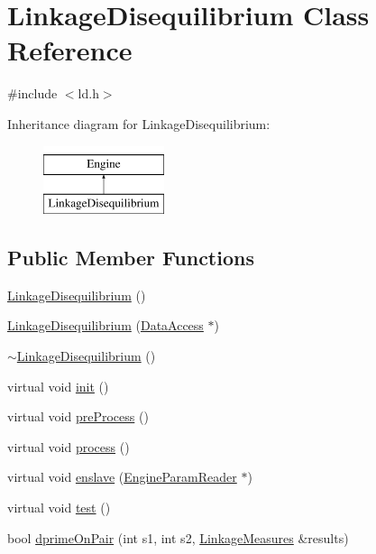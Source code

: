\hypertarget{classLinkageDisequilibrium}{
\section{LinkageDisequilibrium Class Reference}
\label{classLinkageDisequilibrium}
}


{\ttfamily \#include $<$ld.h$>$}

Inheritance diagram for LinkageDisequilibrium:\begin{figure}[H]
\begin{center}
\leavevmode
\includegraphics[height=2cm]{classLinkageDisequilibrium}
\end{center}
\end{figure}
\subsection*{Public Member Functions}
\begin{DoxyCompactItemize}
\item 
\hyperlink{classLinkageDisequilibrium_a2c865ee249f25e08594f44ca2fddedcc}{LinkageDisequilibrium} ()
\item 
\hyperlink{classLinkageDisequilibrium_a3cbd5550ac91f329d76fc7652a58edd5}{LinkageDisequilibrium} (\hyperlink{classDataAccess}{DataAccess} $\ast$)
\item 
\hyperlink{classLinkageDisequilibrium_a8c0492fd94c5c4b966ba10cad283baf1}{$\sim$LinkageDisequilibrium} ()
\item 
virtual void \hyperlink{classLinkageDisequilibrium_a9d3c50f9b7c3f5739ce12eb0b2068c6c}{init} ()
\item 
virtual void \hyperlink{classLinkageDisequilibrium_a2f466153298f2c868a78b5573f6c5048}{preProcess} ()
\item 
virtual void \hyperlink{classLinkageDisequilibrium_a821abc8314c8e6bddc1dfcdf24bdda09}{process} ()
\item 
virtual void \hyperlink{classLinkageDisequilibrium_afb777d3a63bbb0f2d23ce052de891023}{enslave} (\hyperlink{classEngineParamReader}{EngineParamReader} $\ast$)
\item 
virtual void \hyperlink{classLinkageDisequilibrium_a8df37823ab11776642f571e8e8ba7e3b}{test} ()
\item 
bool \hyperlink{classLinkageDisequilibrium_a11db054a2925bd82379a6b39a9f3464f}{dprimeOnPair} (int s1, int s2, \hyperlink{structLinkageMeasures}{LinkageMeasures} \&results)
\end{DoxyCompactItemize}

